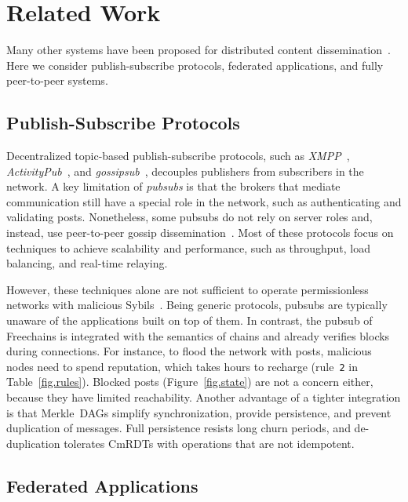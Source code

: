 \documentclass[10pt,journal,compsoc]{IEEEtran}
\newcommand{\FC}       {Freechains\xspace}
\begin{document}
\section{Related Work}
\label{sec.related}


Many other systems have been proposed for distributed content
dissemination~\cite{p2p.survey,p2p.ecosystem}.
Here we consider publish-subscribe protocols, federated applications, and fully
peer-to-peer systems.

\subsection{Publish-Subscribe Protocols}

Decentralized topic-based publish-subscribe protocols, such as
    \emph{XMPP}~\cite{pubsub.xmpp},
    \emph{ActivityPub}~\cite{pubsub.activitypub}, and
    \emph{gossipsub}~\cite{pubsub.gossipsub},
decouples publishers from subscribers in the network.
%
A key limitation of \emph{pubsubs} is that the brokers that mediate
communication still have a special role in the network, such as authenticating
and validating posts.
%
Nonetheless, some pubsubs do not rely on server roles and, instead, use
peer-to-peer gossip dissemination~\cite{pubsub.tera,pubsub.rappel,pubsub.stan,pubsub.vitis,pubsub.gossipsub,pubsub.rappel}.
Most of these protocols focus on techniques to achieve scalability and
performance, such as throughput, load balancing, and real-time relaying.

However, these techniques alone are not sufficient to operate permissionless
networks with malicious Sybils~\cite{pubsub.gossipsub2}.
Being generic protocols, pubsubs are typically unaware of the applications
built on top of them.
In contrast, the pubsub of \FC is integrated with the semantics of chains and
already verifies blocks during connections.
For instance, to flood the network with posts, malicious nodes need to spend
reputation, which takes hours to recharge (rule~\texttt{2} in
Table~\ref{fig.rules}).
Blocked posts (Figure~\ref{fig.state}) are not a concern either, because they
have limited reachability.
Another advantage of a tighter integration is that Merkle~DAGs simplify
synchronization, provide persistence, and prevent duplication of messages.
Full persistence resists long churn periods, and de-duplication tolerates
CmRDTs with operations that are not idempotent.

\subsection{Federated Applications}
\end{document}
